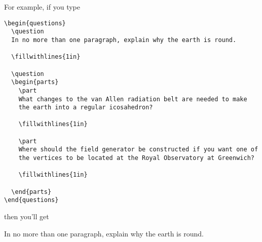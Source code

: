 \documentclass[12pt]{exam}
\begin{document}
\medskip

For example, if you type
\begin{verbatim}
\begin{questions}
  \question 
  In no more than one paragraph, explain why the earth is round.

  \fillwithlines{1in}
  
  \question
  \begin{parts}
    \part
    What changes to the van Allen radiation belt are needed to make
    the earth into a regular icosahedron?

    \fillwithlines{1in}

    \part
    Where should the field generator be constructed if you want one of
    the vertices to be located at the Royal Observatory at Greenwich?

    \fillwithlines{1in}

  \end{parts}
\end{questions}
\end{verbatim}
then you'll get
\begin{questions}
  \question 
  In no more than one paragraph, explain why the earth is round.

  \fillwithlines{1in}
  
  \question
\end{questions}
\end{document}
